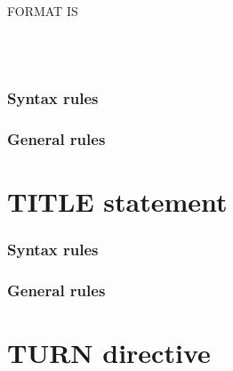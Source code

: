 \begin{syntax}
  \directiveindicator{} FORMAT IS
  \begin{1=}
     \\
     \\
  \end{1=}
\end{syntax}

\subsubsection{Syntax rules}

\subsubsection{General rules}

\section{TITLE statement}

\begin{syntax}[\miscextcolour]
   \literal
\end{syntax}

\subsubsection{Syntax rules}

\subsubsection{General rules}

\section{TURN directive}

\begin{syntax}
\end{syntax}

